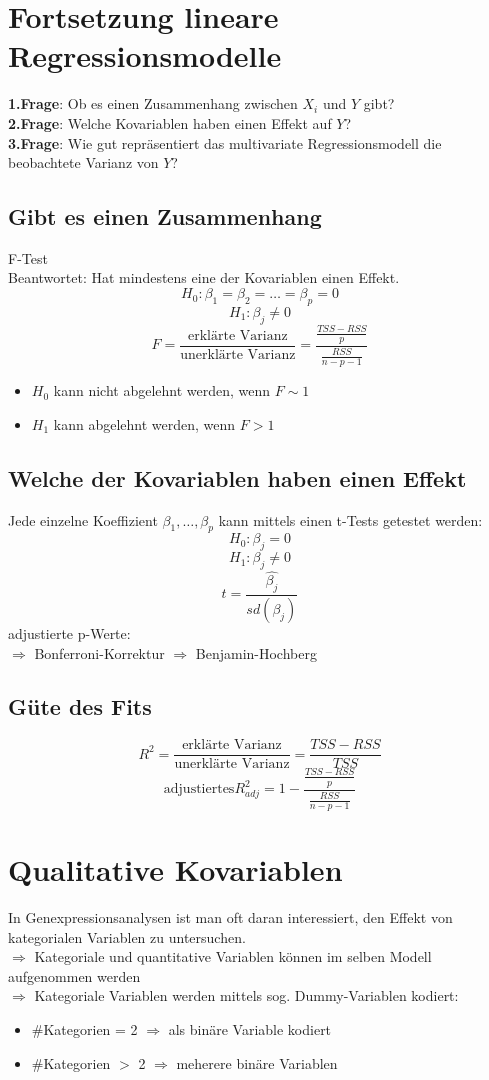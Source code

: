 \section{Fortsetzung lineare Regressionsmodelle}
\textbf{1.Frage}: Ob es einen Zusammenhang zwischen $X_i$ und $Y$ gibt? \\
\textbf{2.Frage}: Welche Kovariablen haben einen Effekt auf $Y$? \\
\textbf{3.Frage}: Wie gut repräsentiert das multivariate Regressionsmodell die beobachtete Varianz von $Y$?\\

\subsection{Gibt es einen Zusammenhang} F-Test\\
Beantwortet: Hat mindestens eine der Kovariablen einen Effekt.
\[ H_0: \beta_1=\beta_2=\dots=\beta_p=0 \]
\[ H_1: \beta_j \neq 0 \]
\[F= \frac{\text{erklärte Varianz}}{\text{unerklärte Varianz}} = \frac{\frac{TSS - RSS}{p}}{\frac{RSS}{n-p-1}} \]
\begin{itemize}
	\item $H_0$ kann nicht abgelehnt werden, wenn $F \sim 1$
	\item $H_1$ kann abgelehnt werden, wenn $F > 1$
\end{itemize}

\subsection{Welche der Kovariablen haben einen Effekt}
Jede einzelne Koeffizient $\beta_1,\dots,\beta_p$ kann mittels einen t-Tests getestet werden:
\[ H_0: \beta_j = 0 \]
\[H_1: \beta_j \neq 0 \]
\[ t= \frac{\hat{\beta_j}}{sd(\beta_j)} \]
adjustierte p-Werte: \\
$\Rightarrow$ Bonferroni-Korrektur
$\Rightarrow$ Benjamin-Hochberg

\subsection{Güte des Fits}
\[ R^{2} = \frac{\text{erklärte Varianz}}{\text{unerklärte Varianz}} = \frac{TSS -RSS}{TSS} \]
\[ \text{adjustiertes} R_{adj}^{2} = 1 - \frac{\frac{TSS - RSS}{p}}{\frac{RSS}{n-p-1}} \]

\section{Qualitative Kovariablen}
In Genexpressionsanalysen ist man oft daran interessiert, den Effekt von kategorialen Variablen zu untersuchen.\\
$\Rightarrow$ Kategoriale und quantitative Variablen können im selben Modell aufgenommen werden \\
$\Rightarrow$ Kategoriale Variablen werden mittels sog. Dummy-Variablen kodiert:
	\begin{itemize}
		\item \#Kategorien = 2 $\Rightarrow$ als binäre Variable kodiert
		\item \#Kategorien $>$ 2 $\Rightarrow$ meherere binäre Variablen
	\end{itemize}

